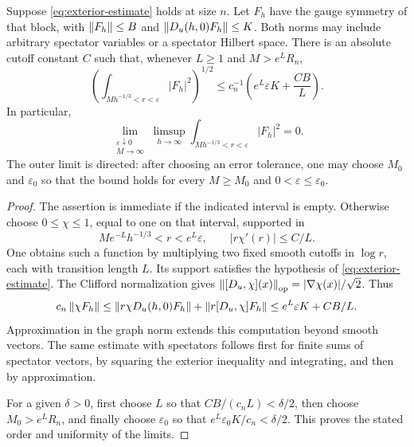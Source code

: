 \begin{lemma}
\label{lem:intermediate-scales}
Suppose \eqref{eq:exterior-estimate} holds at size \(n\). Let \(F_h\) have the
gauge symmetry of that block, with
\(\left\lVert F_h\right\rVert\le B\) and \(\left\lVert D_u(h,0)F_h\right\rVert\le K\). Both norms may include
arbitrary spectator variables or a spectator Hilbert space. There is an
absolute cutoff constant \(C\) such that, whenever \(L\ge1\) and
\(M>e^LR_n\),
\begin{equation}\label{prof:intermediate-bound}
 \left(\int_{Mh^{-1/3}<r<\varepsilon}|F_h|^2\right)^{1/2}
 \le c_n^{-1}\left(e^L\varepsilon K+\frac{CB}{L}\right).
\end{equation}
In particular,
\begin{equation}\label{eq:intermediate-scales}
 \lim_{\substack{\varepsilon\downarrow0\\M\to\infty}}
 \limsup_{h\to\infty}
 \int_{Mh^{-1/3}<r<\varepsilon}|F_h|^2=0.
\end{equation}
The outer limit is directed: after choosing an error tolerance, one may
choose \(M_0\) and \(\varepsilon_0\) so that the bound holds for every
\(M\ge M_0\) and \(0<\varepsilon\le\varepsilon_0\).
\end{lemma}

\begin{proof}
The assertion is immediate if the indicated interval is empty. Otherwise
choose \(0\le\chi\le1\), equal to one on that interval, supported in
\[
 Me^{-L}h^{-1/3}<r<e^L\varepsilon,
 \qquad |r\chi'(r)|\le C/L.
\]
One obtains such a function by multiplying two fixed smooth cutoffs in
\(\log r\), each with transition length \(L\). Its support satisfies the
hypothesis of \eqref{eq:exterior-estimate}. The Clifford normalization gives
\(\left\lVert [D_u,\chi](x)\right\rVert_{\mathrm{op}}=|\nabla\chi(x)|/\sqrt2\). Thus
\[
 c_n\left\lVert \chi F_h\right\rVert
 \le\left\lVert r\chi D_u(h,0)F_h\right\rVert+
       \left\lVert r[D_u,\chi]F_h\right\rVert
 \le e^L\varepsilon K+CB/L.
\]
Approximation in the graph norm extends this computation beyond smooth
vectors. The same estimate with spectators follows first for finite sums
of spectator vectors, by squaring the exterior inequality and integrating,
and then by approximation.

For a given \(\delta>0\), first choose \(L\) so that
\(CB/(c_nL)<\delta/2\), then choose \(M_0>e^LR_n\), and finally choose
\(\varepsilon_0\) so that \(e^L\varepsilon_0K/c_n<\delta/2\). This proves
the stated order and uniformity of the limits.
\end{proof}

